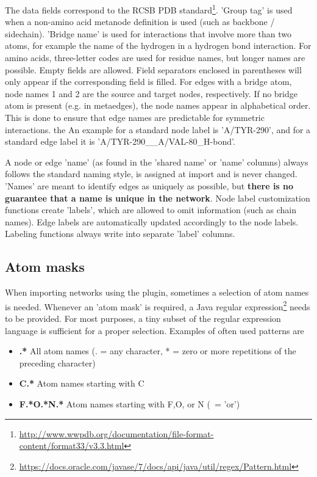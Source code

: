 The data fields correspond to the RCSB PDB \cite{PDB} standard\footnote{\url{http://www.wwpdb.org/documentation/file-format-content/format33/v3.3.html}}. 'Group tag' is used when a non-amino acid metanode definition is used (such as backbone / sidechain). 'Bridge name' is used for interactions that involve more than two atoms, for example the name of the hydrogen in a hydrogen bond interaction. For amino acids, three-letter codes are used for residue names, but longer names are possible. Empty fields are allowed. Field separators enclosed in parentheses will only appear if the corresponding field is filled. For edges with a bridge atom, node names 1 and 2 are the source and target nodes, respectively. If no bridge atom is present (e.g. in metaedges), the node names appear in alphabetical order. This is done to ensure that edge names are predictable for symmetric interactions. the An example for a standard node label is 'A/TYR-290', and for a standard edge label it is 'A/TYR-290\_\_A/VAL-80\_H-bond'. 

A node or edge 'name' (as found in the 'shared name' or 'name' columns) always follows the standard naming style, is assigned at import and is never changed. 'Names' are meant to identify edges as uniquely as possible, but \textbf{there is no guarantee that a name is unique in the network}. Node label customization functions create 'labels', which are allowed to omit information (such as chain names). Edge labels are automatically updated accordingly to the node labels. Labeling functions always write into separate 'label' columns.

\subsection{Atom masks}
\label{sec:atom_masks}

When importing networks using the plugin, sometimes a selection of atom names is needed. Whenever an 'atom mask' is required, a Java regular expression\footnote{\url{https://docs.oracle.com/javase/7/docs/api/java/util/regex/Pattern.html}} needs to be provided. For most purposes, a tiny subset of the regular expression language is sufficient for a proper selection. Examples of often used patterns are

\begin{itemize}
  \item \textbf{.*} All atom names (. = any character, * = zero or more repetitions of the preceding character)
  \item \textbf{C.*} Atom names starting with C
  \item \textbf{F.*\textbar O.*\textbar N.*} Atom names starting with F,O, or N (\textbar\ = 'or')
\end{itemize}

